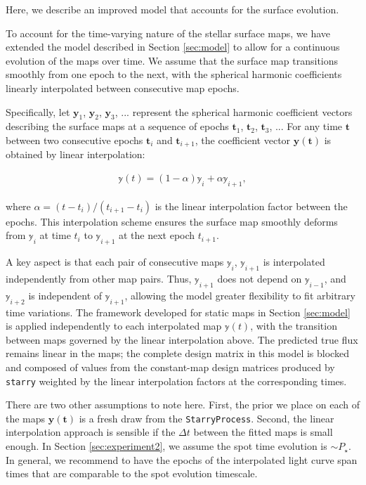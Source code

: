 \documentclass[twocolumn]{aastex631}
\begin{document}
Here, we describe an improved model that accounts for the surface evolution.

To account for the time-varying nature of the stellar surface maps, we have extended the model described in Section \ref{sec:model} to allow 
for a continuous evolution of the maps over 
time. We assume that the surface map transitions smoothly from one epoch to the next, with the spherical harmonic 
coefficients linearly interpolated between consecutive map epochs. 

Specifically, let $\pmb{y}_1$,
$\pmb{y}_2$, $\pmb{y}_3$, ... represent the spherical harmonic coefficient
vectors describing the surface maps at a sequence of epochs $\pmb{t}_1$,
$\pmb{t}_2$, $\pmb{t}_3$, ... For any time $\pmb{t}$ between two consecutive
epochs $\pmb{t}_i$ and $\pmb{t}_{i+1}$, the coefficient vector $\pmb{y(t)}$ is
obtained by linear interpolation:
\begin{linenomath}\begin{align}\label{linearinterp}
    \mathbb{y}(t) = (1 - \alpha)\mathbb{y}_i + \alpha\mathbb{y}_{i+1},
\end{align}\end{linenomath}

where $\alpha = (t - t_i) / (t_{i+1} - t_i)$ is the linear interpolation factor between the epochs. 
This interpolation scheme ensures the surface map smoothly deforms from $\mathbb{y}_i$ at time $t_i$ to $\mathbb{y}_{i+1}$ at the next epoch $t_{i+1}$.

A key aspect is that each pair of consecutive maps $\mathbb{y}_i$, $\mathbb{y}_{i+1}$
is interpolated independently from other map pairs. Thus, $\mathbb{y}_{i+1}$ does
not depend on $\mathbb{y}_{i-1}$, and $\mathbb{y}_{i+2}$ is independent of
$\mathbb{y}_{i+1}$, allowing the model greater flexibility to fit arbitrary time
variations. The framework developed for static maps in Section \ref{sec:model}
is applied independently to each interpolated map $\mathbb{y}(t)$, with the
transition between maps governed by the linear interpolation above.
The predicted true flux remains linear in the maps; the complete
design matrix in this model is blocked and composed of values from the
constant-map design matrices produced by \texttt{starry} weighted by the linear
interpolation factors at the corresponding times.

There are two other assumptions to note here. First, the prior we place on each
of the maps $\pmb{y(t)}$ is a fresh draw from the \texttt{StarryProcess}.
Second, the linear interpolation approach is sensible if the $\Delta t$ between
the fitted maps is small enough. In Section \ref{sec:experiment2}, we assume the
spot time evolution is $\sim P_{\star}$. In general, we recommend to have the
epochs of the interpolated light
curve span times that are comparable to the spot evolution
timescale.
\end{document}
